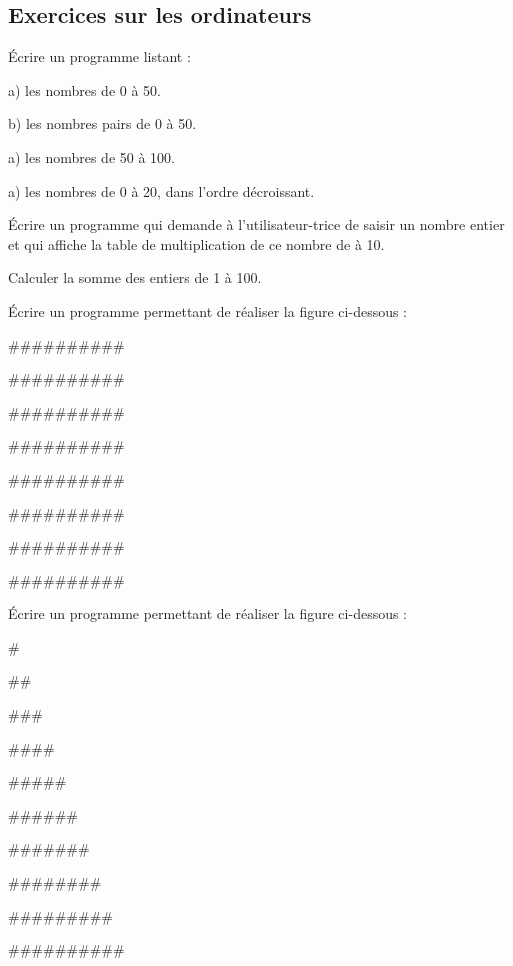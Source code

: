 \documentclass[11pt, a4paper]{book}
\begin{document}
\subsection{Exercices sur les ordinateurs}

\begin{exercice}
Écrire un programme listant :
\item[a)] les nombres de 0 à 50.
\item[b)] les nombres pairs de 0 à 50.
\item[a)] les nombres de 50 à 100.
\item[a)] les nombres  de 0 à 20, dans l'ordre décroissant.
\end{exercice}

\begin{exercice}
Écrire un programme qui demande à l'utilisateur-trice de saisir un nombre entier et qui affiche la table de multiplication de ce nombre de à 10.
\end{exercice}


\begin{exercice}
Calculer la somme des entiers de 1 à 100.
\end{exercice}

\begin{exercice}
Écrire un programme permettant de réaliser la figure ci-dessous :

\#\#\#\#\#\#\#\#\#\#

\#\#\#\#\#\#\#\#\#\#

\#\#\#\#\#\#\#\#\#\#

\#\#\#\#\#\#\#\#\#\#

\#\#\#\#\#\#\#\#\#\#

\#\#\#\#\#\#\#\#\#\#

\#\#\#\#\#\#\#\#\#\#

\#\#\#\#\#\#\#\#\#\#
\end{exercice}


\begin{exercice}
Écrire un programme permettant de réaliser la figure ci-dessous :

\#

\#\#

\#\#\#

\#\#\#\#

\#\#\#\#\#

\#\#\#\#\#\#

\#\#\#\#\#\#\#

\#\#\#\#\#\#\#\#

\#\#\#\#\#\#\#\#\#

\#\#\#\#\#\#\#\#\#\#
\end{exercice}
\end{document}
